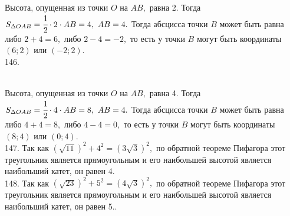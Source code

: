 \documentclass[12pt]{article}
\begin{document}
Высота, опущенная из точки $O$ на $AB,$ равна 2. Тогда $S_{\Delta OAB}=\cfrac{1}{2}\cdot 2 \cdot AB=4,\ AB=4.$ Тогда абсцисса точки $B$ может быть равна либо $2+4=6,$ либо $2-4=-2,$ то есть у точки $B$ могут быть координаты $(6;2)$ или $(-2;2).$\\
146. \begin{figure}[ht!]
\end{figure}\\
Высота, опущенная из точки $O$ на $AB,$ равна 4. Тогда $S_{\Delta OAB}=\cfrac{1}{2}\cdot 4 \cdot AB=8,\ AB=4.$ Тогда абсцисса точки $B$ может быть равна либо $4+4=8,$ либо $4-4=0,$ то есть у точки $B$ могут быть координаты $(8;4)$ или $(0;4).$\\
147. Так как $(\sqrt{11})^2+4^2=(3\sqrt{3})^2,$ по обратной теореме Пифагора этот треугольник является прямоугольным и его наибольшей высотой является наибольший катет, он равен 4.\\
148. Так как $(\sqrt{23})^2+5^2=(4\sqrt{3})^2,$ по обратной теореме Пифагора этот треугольник является прямоугольным и его наибольшей высотой является наибольший катет, он равен 5.\newpage{}. \begin{figure}[ht!]
\end{figure}\\
\end{document}
